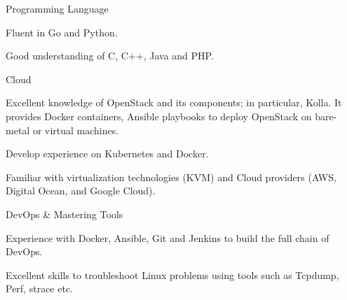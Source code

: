 \begin{cventries}
  \cventry
    {Programming Language}
    {}
    {}
    {}
    {
      \begin{cvitems}
        \item {Fluent in Go and Python.}
        \item {Good understanding of C, C++, Java and PHP.}
      \end{cvitems}
    }
    \cventry
    {Cloud}
    {}
    {}
    {}
    {
      \begin{cvitems}
        \item {Excellent knowledge of OpenStack and its components; in particular, Kolla. It provides Docker containers, Ansible playbooks to deploy OpenStack on bare-metal or virtual machines.}
        \item {Develop experience on Kubernetes and Docker.}
        \item {Familiar with virtualization technologies (KVM) and Cloud providers (AWS, Digital Ocean, and Google Cloud).}
      \end{cvitems}
    }

    \cventry
    {DevOps \& Mastering Tools}
    {}
    {}
    {}
    {
      \begin{cvitems}
        \item {Experience with Docker, Ansible, Git and Jenkins to build the full chain of DevOps.}
        \item {Excellent skills to troubleshoot Linux problems using tools such as Tcpdump, Perf, strace etc.}
      \end{cvitems}
    }
    
\end{cventries}

